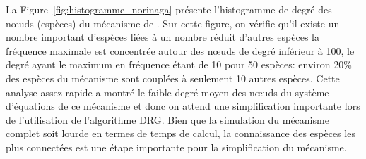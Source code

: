 La Figure~\ref{fig:histogramme_norinaga} présente l'histogramme de degré des n{\oe}uds (espèces) du mécanisme de \citet{Norinaga2009}. Sur cette figure, on vérifie qu'il existe un nombre important d'espèces liées à un nombre réduit d'autres espèces \textemdash{} la fréquence maximale est concentrée autour des n{\oe}uds de degré inférieur à 100, le degré ayant le maximum en fréquence étant de 10 pour 50 espèces: environ 20\% des espèces du mécanisme sont couplées à seulement 10 autres espèces. Cette analyse assez rapide a montré le faible degré moyen des n{\oe}uds du système d'équations de ce mécanisme et donc on attend une simplification importante lors de l'utilisation de l'algorithme DRG. Bien que la simulation du mécanisme complet soit lourde en termes de temps de calcul, la connaissance des espèces les plus connectées est une étape importante pour la simplification du mécanisme.%

